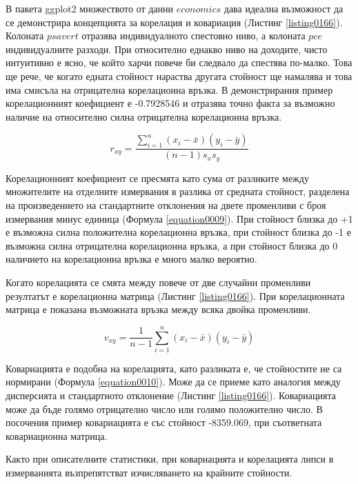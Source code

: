 В пакета ggplot2 множеството от данни $economics$ дава идеална възможност да се демонстрира концепцията за корелация и ковариация (Листинг \ref{listing0166}). Колоната $psavert$ отразява индивидуалното спестовно ниво, а колоната $pce$ индивидуалните разходи. При относително еднакво ниво на доходите, чисто интуитивно е ясно, че който харчи повече би следвало да спестява по-малко. Това ще рече, че когато едната стойност нараства другата стойност ще намалява и това има смисъла на отрицателна корелационна връзка. В демонстрирания пример корелационният коефициент е -0.7928546 и отразява точно факта за възможно наличие на относително силна отрицателна корелационна връзка. 

\begin{equation}
r_{xy} = \frac{\sum_{i=1}^{n}(x_i-\bar{x})(y_i-\bar{y})}{(n-1)s_xs_y}
\label{equation0009}
\end{equation}

Корелационният коефициент се пресмята като сума от разликите между множителите на отделните измервания в разлика от средната стойност, разделена на произведението на стандартните отклонения на двете променливи с броя измервания минус единица (Формула \ref{equation0009}). При стойност близка до +1 е възможна силна положителна корелационна връзка, при стойност близка до -1 е възможна силна отрицателна корелационна връзка, а при стойност близка до 0 наличието на корелационна връзка е много малко вероятно. 

Когато корелацията се смята между повече от две случайни променливи резултатът е корелационна матрица (Листинг \ref{listing0166}). При корелационната матрица е показана възможната връзка между всяка двойка променливи. 

\begin{equation}
v_{xy} = \frac{1}{n-1}\sum_{i=1}^{n}(x_i-\bar{x})(y_i-\bar{y})
\label{equation0010}
\end{equation}

Ковариацията е подобна на корелацията, като разликата е, че стойностите не са нормирани (Формула \ref{equation0010}). Може да се приеме като аналогия между дисперсията и стандартното отклонение (Листинг \ref{listing0166}). Ковариацията може да бъде голямо отрицателно число или голямо положително число. В посочения пример ковариацията е със стойност -8359.069, при съответната ковариационна матрица. 

Както при описателните статистики, при ковариацията и корелацията липси в измерванията възпрепятстват изчисляването на крайните стойности. 

